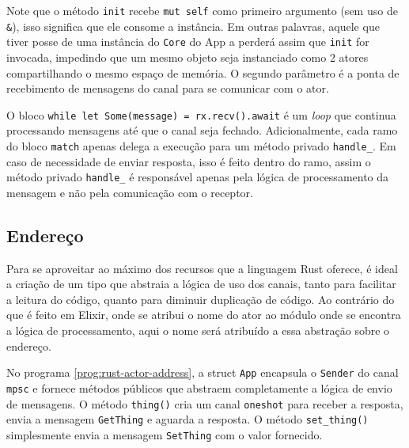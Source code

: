 \begin{program}
  
  \caption{Exemplo de método init para processamento de mensagens.\label{prog:rust-core-init}}
\end{program}

Note que o método \texttt{init} recebe \texttt{mut self} como primeiro argumento (sem uso de \texttt{\&}), isso significa que ele consome a instância. Em outras palavras, aquele que tiver posse de uma instância do \texttt{Core} do App a perderá assim que \texttt{init} for invocada, impedindo que um mesmo objeto seja instanciado como 2 atores compartilhando o mesmo espaço de memória. O segundo parâmetro é a ponta de recebimento de mensagens do canal para se comunicar com o ator.

O bloco \texttt{while let Some(message) = rx.recv().await} é um \emph{loop} que continua processando mensagens até que o canal seja fechado. Adicionalmente, cada ramo do bloco \texttt{match} apenas delega a execução para um método privado \texttt{handle\_}. Em caso de necessidade de enviar resposta, isso é feito dentro do ramo, assim o método privado \texttt{handle\_} é responsável apenas pela lógica de processamento da mensagem e não pela comunicação com o receptor.

\subsection{Endereço}

Para se aproveitar ao máximo dos recursos que a linguagem Rust oferece, é ideal a criação de um tipo que abstraia a lógica de uso dos canais, tanto para facilitar a leitura do código, quanto para diminuir duplicação de código. Ao contrário do que é feito em Elixir, onde se atribui o nome do ator ao módulo onde se encontra a lógica de processamento, aqui o nome será atribuído a essa abstração sobre o endereço.

\begin{program}
  
  \caption{Exemplo de struct para endereço do ator.\label{prog:rust-actor-address}}
\end{program}

No programa \ref{prog:rust-actor-address}, a struct \texttt{App} encapsula o \texttt{Sender} do canal \texttt{mpsc} e fornece métodos públicos que abstraem completamente a lógica de envio de mensagens. O método \texttt{thing()} cria um canal \texttt{oneshot} para receber a resposta, envia a mensagem \texttt{GetThing} e aguarda a resposta. O método \texttt{set\_thing()} simplesmente envia a mensagem \texttt{SetThing} com o valor fornecido.

